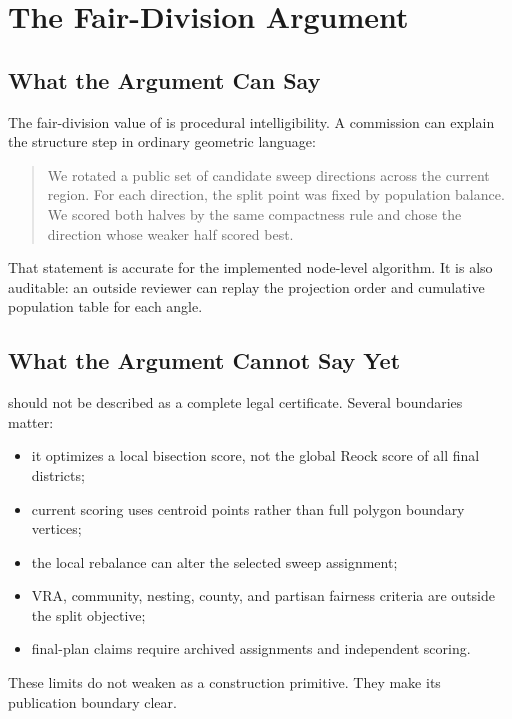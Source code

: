 \section{The Fair-Division Argument}
\label{sec:fair-division}

\subsection{What the Argument Can Say}

The fair-division value of \mka{} is procedural intelligibility. A commission
can explain the structure step in ordinary geometric language:

\begin{quote}
We rotated a public set of candidate sweep directions across the current
region. For each direction, the split point was fixed by population balance.
We scored both halves by the same compactness rule and chose the direction
whose weaker half scored best.
\end{quote}

That statement is accurate for the implemented node-level algorithm. It is also
auditable: an outside reviewer can replay the projection order and cumulative
population table for each angle.

\subsection{What the Argument Cannot Say Yet}

\mka{} should not be described as a complete legal certificate. Several
boundaries matter:

\begin{itemize}
\item it optimizes a local bisection score, not the global Reock score of all
  final districts;
\item current scoring uses centroid points rather than full polygon boundary
  vertices;
\item the local rebalance can alter the selected sweep assignment;
\item VRA, community, nesting, county, and partisan fairness criteria are
  outside the split objective;
\item final-plan claims require archived assignments and independent scoring.
\end{itemize}

These limits do not weaken \mka{} as a construction primitive. They make its
publication boundary clear.

